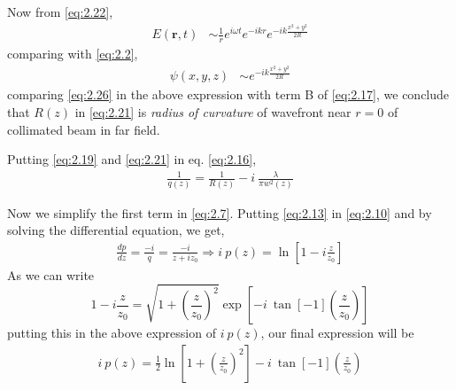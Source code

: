 \documentclass[11pt,a4paper]{article}
\numberwithin{equation}{section}
\begin{document}
Now from \ref{eq:2.22},
\begin{align}
	E(\boldsymbol{r},t) &\sim \frac{1}{r} e^{i\omega t} e^{-ikr} {e^{-ik\frac{x^2+y^2}{2R}}}
\end{align}
comparing with \ref{eq:2.2},
\begin{align}
	\psi({x,y,z}) &\sim e^{-ik\frac{x^2+y^2}{2R}} \label{eq:2.26}
\end{align}
comparing \ref{eq:2.26} in the above expression with term B of \ref{eq:2.17}, we conclude that $R(z)$ in \ref{eq:2.21} is \textit{radius of curvature} of wavefront near $r=0$ of collimated beam in far field.


Putting \ref{eq:2.19} and \ref{eq:2.21} in eq. \ref{eq:2.16},
\begin{align}
	\boxed{\frac{1}{q(z)} = \frac{1}{R(z)} - i\: \frac{\lambda}{\pi w^2(z)}} \label{eq:2.27}
\end{align}


Now we simplify the first term in \ref{eq:2.7}. Putting \ref{eq:2.13} in \ref{eq:2.10} and by solving the differential equation,  we get,
\begin{align}
	\frac{dp}{dz}= \frac{-i}{q} =\frac{-i}{z+iz_0} \Rightarrow i\:p(z) = \ln\left[1- i \frac{z}{z_0}\right]
\end{align}
As we can write
$$
1- i \frac{z}{z_0} = \sqrt{1+ \left(\frac{z}{z_0}\right)^2} \exp\left[{-i\:\tan[-1](\frac{z}{z_0})}\right]
$$
putting this in the above expression of $i\:p(z)$, our final expression will be
\begin{align}
	i\:p(z)=\frac{1}{2}\ln\left[1+ \left(\frac{z}{z_0}\right)^2\right]-i\: \tan[-1](\frac{z}{z_0}) \label{eq:2.29}
\end{align}
\end{document}
